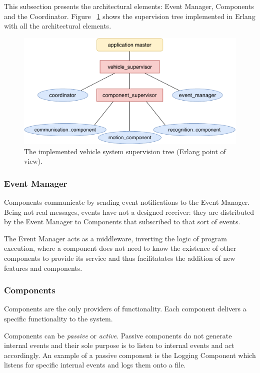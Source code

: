 \documentclass{memoir}
\begin{document}
This subsection presents the architectural elements: Event Manager, Components and the Coordinator. Figure ~\ref{fig:erlang-point-of-view} shows the supervision tree implemented in Erlang with all the architectural elements.

\begin{figure}
	\centering
	\includegraphics[width=0.8\linewidth]{implementation_details/erlang_point-of-view.pdf}
	\caption{The implemented vehicle system supervision tree (Erlang point of view).}
	\label{fig:erlang-point-of-view}
\end{figure}

\subsubsection{Event Manager}

Components communicate by sending event notifications to the Event Manager.
Being not real messages, events have not a designed receiver: they are distributed by the Event Manager to Components that subscribed to that sort of events.

The Event Manager acts as a middleware, inverting the logic of program execution, where a component does not need to know the existence of other components to provide its service and thus facilitatates the addition of new features and components.

\subsubsection{Components}

Components are the only providers of functionality. Each component delivers a specific functionality to the system.

Components can be \textit{passive} or \textit{active}. Passive components do not generate internal events and their sole purpose is to listen to internal events and act accordingly. An example of a passive component is the Logging Component which listens for specific internal events and logs them onto a file.
\end{document}
